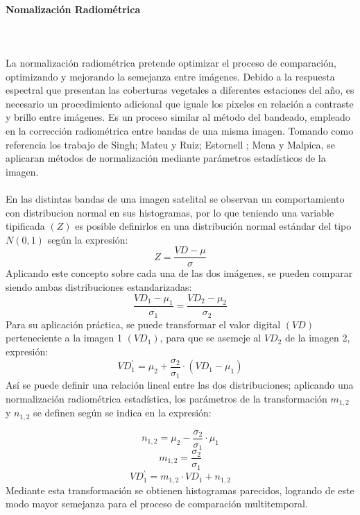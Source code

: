 \paragraph{Nomalizaci\'on Radiom\'etrica}\mbox{}\\\mbox{}\\
La normalizaci\'on radiom\'etrica pretende optimizar el proceso de comparaci\'on, optimizando y mejorando la semejanza entre im\'agenes. Debido a la respuesta espectral que presentan las coberturas vegetales a diferentes estaciones del a\~{n}o, es necesario un procedimiento adicional que iguale los pixeles en relaci\'on a contraste y brillo entre im\'agenes. Es un proceso similar al m\'etodo del bandeado, empleado en la correcci\'on radiom\'etrica entre bandas de una misma imagen. Tomando como referencia los trabajo de Singh\cite{singh1989review}; Mateu y Ruiz\cite{mateu1999comparacion}; Estornell \cite{estornell2004analisis}; Mena y Malpica\cite{malpica2002fusion}, se aplicaran m\'etodos de normalizaci\'on mediante par\'ametros estad\'isticos de la imagen.\\~\\
En las distintas bandas de una imagen satelital se observan un comportamiento con distribucion normal en sus histogramas, por lo que teniendo una variable tipificada $(Z)$ es posible definirlos en una distribuci\'on normal est\'andar del tipo $ N(0,1) $ seg\'un la expresión:
	\begin{equation}
	Z=\dfrac{VD-\mu}{\sigma}
	\end{equation}
	Aplicando este concepto sobre cada una de las dos im\'agenes, se pueden comparar siendo ambas distribuciones estandarizadas:
	\begin{equation}
	\dfrac{VD_{1}-\mu_{1}}{\sigma_{1}}=\dfrac{VD_{2}-\mu_{2}}{\sigma_{2}}
	\end{equation}
	Para su aplicaci\'on pr\'actica, se puede transformar el valor digital $ (VD) $ perteneciente a la imagen 1 $ (VD_{1}) $, para que se asemeje al $ VD_{2} $ de la imagen 2, expresi\'on:
	\begin{equation}
	VD_{1}^{'}=\mu_{2}+\dfrac{\sigma_{2}}{\sigma_{1}}\cdot(VD_{1}-\mu_{1})
	\end{equation}
	As\'i se puede definir una relaci\'on lineal entre las dos distribuciones; aplicando una normalizaci\'on radiom\'etrica estad\'istica, los par\'ametros de la transformaci\'on $ m_{1,2} $ y $ n_{1,2} $ se definen seg\'un se indica en la expresi\'on:
	
			\begin{equation}
			n_{1,2}=\mu_{2}-\dfrac{\sigma_{2}}{\sigma_{1}}\cdot\mu_{1}
			\end{equation}
					\begin{equation}
					m_{1,2}=\dfrac{\sigma_{2}}{\sigma_{1}}
					\end{equation}
		\begin{equation}
				VD_{1}^{'}=m_{1,2}\cdot VD_{1}+n_{1,2}
		\end{equation}
	Mediante esta transformaci\'on se obtienen histogramas parecidos, logrando de este modo mayor semejanza para el proceso de comparaci\'on multitemporal.
	
